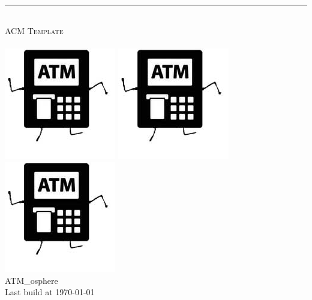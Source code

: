 \begin{titlepage}
	\pagestyle{empty}
	
	\begin{center}
		~\\[80pt]
		\hrule\ \\[8pt]
		\fontsize{48pt}{\baselineskip}\selectfont  \textsc{ACM Template}\\[8pt]
		~\\[20pt]
		\includegraphics[scale=1]{./cover.jpg}  
		\includegraphics[scale=1]{./cover.jpg}  
		\includegraphics[scale=1]{./cover.jpg}    
		~\\[20pt]
		\huge ATM\_osphere\\[8pt]
		\Large Last build at \today
	\end{center}
\end{titlepage}
\restoregeometry
